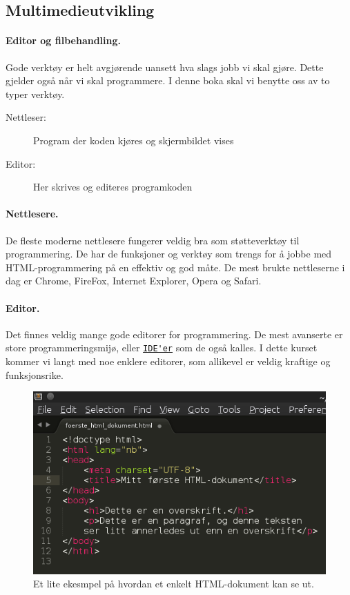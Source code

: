 \documentclass[%
oneside,                 %
final,                   %
12pt]{article}
\begin{document}
\noindent

\subsection{Multimedieutvikling}
\label{section:teori:multimedieutvikling}

\paragraph{Editor og filbehandling.}
\label{section:teori:editorogfilbehandling}

Gode verktøy er helt avgjørende uansett hva slags jobb vi skal
gjøre. Dette gjelder også når vi skal programmere. I denne boka
skal vi benytte oss av to typer verktøy.

\begin{description}
\item[Nettleser:] 
  Program der koden kjøres og skjermbildet vises

\item[Editor:] 
  Her skrives og editeres programkoden 
\end{description}

\noindent
\paragraph{Nettlesere.}

De fleste moderne nettlesere fungerer veldig bra som støtteverktøy
til programmering. De har de funksjoner og verktøy som trengs for å
jobbe med HTML-programmering på en effektiv og god måte. De mest
brukte nettleserne i dag er Chrome, FireFox, Internet Explorer, Opera
og Safari.

\paragraph{Editor.}

Det finnes veldig mange gode editorer for programmering. De mest
avanserte er store programmeringsmijø, eller
\href{{http://en.wikipedia.org/wiki/Integrated_development_environment}}{\nolinkurl{IDE'er}}
som de også kalles. I dette kurset kommer vi langt med noe enklere
editorer, som allikevel er veldig kraftige og funksjonsrike.


\begin{figure}[t]
  \centerline{\includegraphics[width=0.5\linewidth]{figures/editor_sublime_eksempel.png}}
  \caption{
  Et lite ekesmpel på hvordan et enkelt HTML-dokument kan se ut.
  }
\end{figure}
\end{document}
